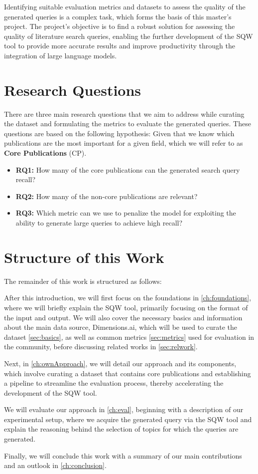 Identifying suitable evaluation metrics and datasets to assess the quality of the generated queries is a complex task, which forms the basis of this master's project. The project’s objective is to find a robust solution for assessing the quality of literature search queries, enabling the further development of the SQW tool to provide more accurate results and improve productivity through the integration of large language models.


\section{Research Questions}\label{sec:researchQuestions}

There are three main research questions that we aim to address while curating the dataset and formulating the metrics to evaluate the generated queries. These questions are based on the following hypothesis: Given that we know which publications are the most important for a given field, which we will refer to as \textbf{Core Publications} (CP).

\begin{itemize}
	\item \textbf{RQ1:} How many of the core publications can the generated search query recall?
	\item \textbf{RQ2:} How many of the non-core publications are relevant?
	\item \textbf{RQ3:} Which metric can we use to penalize the model for exploiting the ability to generate large queries to achieve high recall?
\end{itemize}



\section{Structure of this Work}\label{sec:structure}
The remainder of this work is structured as follows:

After this introduction, we will first focus on the foundations in \autoref{ch:foundations}, where we will briefly explain the SQW tool, primarily focusing on the format of the input and output. We will also cover the necessary basics and information about the main data source, Dimensions.ai, which will be used to curate the dataset \autoref{sec:basics}, as well as common metrics \autoref{sec:metrics} used for evaluation in the community, before discussing related works in \autoref{sec:relwork}.

Next, in \autoref{ch:ownApproach}, we will detail our approach and its components, which involve curating a dataset that contains core publications and establishing a pipeline to streamline the evaluation process, thereby accelerating the development of the SQW tool.

We will evaluate our approach in \autoref{ch:eval}, beginning with a description of our experimental setup, where we acquire the generated query via the SQW tool and explain the reasoning behind the selection of topics for which the queries are generated. 

Finally, we will conclude this work with a summary of our main contributions and an outlook in \autoref{ch:conclusion}.

